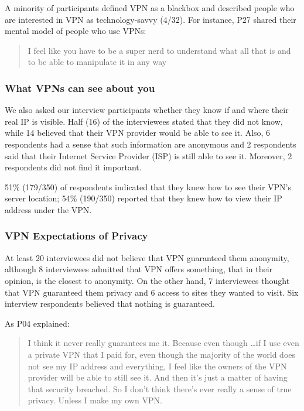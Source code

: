 A minority of participants defined VPN as a blackbox and described people who are
interested in VPN as technology-savvy (4/32). For instance, P27 shared their mental model of
people who use VPNs: \begin{quote}I feel like you have to be a super nerd to  understand what all that is and to be able to manipulate it in any
way\end{quote}





\subsubsection{What VPNs can see about you}
We also asked our interview participants whether they know if and where their
real IP is visible. Half (16) of the interviewees stated that they did not
know, while 14 believed that their VPN provider would be able to see it. Also,
6 respondents had a sense that such information are anonymous and 2
respondents said that their Internet Service Provider (ISP) is still able to
see it. Moreover, 2 respondents did not find it important.

51\% (179/350) of respondents indicated that they knew how to see their
VPN’s server location; 54\% (190/350) reported that they knew how to view
their IP address under the VPN.









\subsubsection{VPN Expectations of Privacy} At least 20 interviewees did not
believe that VPN guaranteed them anonymity, although 8 interviewees admitted
that VPN offers something, that in their opinion, is the closest to anonymity.
On the other hand, 7 interviewees thought that VPN guaranteed them privacy and
6 access to sites they wanted to visit. Six interview respondents believed
that nothing is guaranteed.

As P04 explained: \begin{quote}I think it never really guarantees me it.
Because even though \dots if I use even a private VPN that I paid for, even
though the majority of the world does not see my IP address and everything, I
feel like the owners of the VPN provider will be able to still see it. And
then it's just a matter of having that security breached. So I don't think
there's ever really a sense of true privacy. Unless I make my own
VPN.\end{quote}

